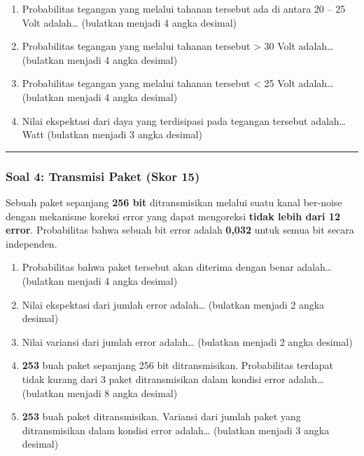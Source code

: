 \documentclass[
  letterpaper,
  DIV=11,
  numbers=noendperiod]{scrartcl}
\providecommand{\tightlist}{%
  \setlength{\itemsep}{0pt}\setlength{\parskip}{0pt}}
\begin{document}
\begin{enumerate}
\def\labelenumi{\alph{enumi}.}
\tightlist
\item
  Probabilitas tegangan yang melalui tahanan tersebut ada di antara 20
  -- 25 Volt adalah\ldots{} (bulatkan menjadi 4 angka desimal)
\item
  Probabilitas tegangan yang melalui tahanan tersebut \textgreater{} 30
  Volt adalah\ldots{} (bulatkan menjadi 4 angka desimal)
\item
  Probabilitas tegangan yang melalui tahanan tersebut \textless{} 25
  Volt adalah\ldots{} (bulatkan menjadi 4 angka desimal)
\item
  Nilai ekspektasi dari daya yang terdisipasi pada tegangan tersebut
  adalah\ldots{} Watt (bulatkan menjadi 3 angka desimal)
\end{enumerate}

\begin{center}\rule{0.5\linewidth}{0.5pt}\end{center}

\subsubsection{\texorpdfstring{\textbf{Soal 4: Transmisi Paket (Skor
15)}}{Soal 4: Transmisi Paket (Skor 15)}}\label{soal-4-transmisi-paket-skor-15}

Sebuah paket sepanjang \textbf{256 bit} ditransmisikan melalui suatu
kanal ber-noise dengan mekanisme koreksi error yang dapat mengoreksi
\textbf{tidak lebih dari 12 error}. Probabilitas bahwa sebuah bit error
adalah \textbf{0,032} untuk semua bit secara independen.

\begin{enumerate}
\def\labelenumi{\alph{enumi}.}
\tightlist
\item
  Probabilitas bahwa paket tersebut akan diterima dengan benar
  adalah\ldots{} (bulatkan menjadi 4 angka desimal)
\item
  Nilai ekspektasi dari jumlah error adalah\ldots{} (bulatkan menjadi 2
  angka desimal)
\item
  Nilai variansi dari jumlah error adalah\ldots{} (bulatkan menjadi 2
  angka desimal)
\item
  \textbf{253} buah paket sepanjang 256 bit ditransmisikan. Probabilitas
  terdapat tidak kurang dari 3 paket ditransmisikan dalam kondisi error
  adalah\ldots{} (bulatkan menjadi 8 angka desimal)
\item
  \textbf{253} buah paket ditransmisikan. Variansi dari jumlah paket
  yang ditransmisikan dalam kondisi error adalah\ldots{} (bulatkan
  menjadi 3 angka desimal)
\end{enumerate}
\end{document}
